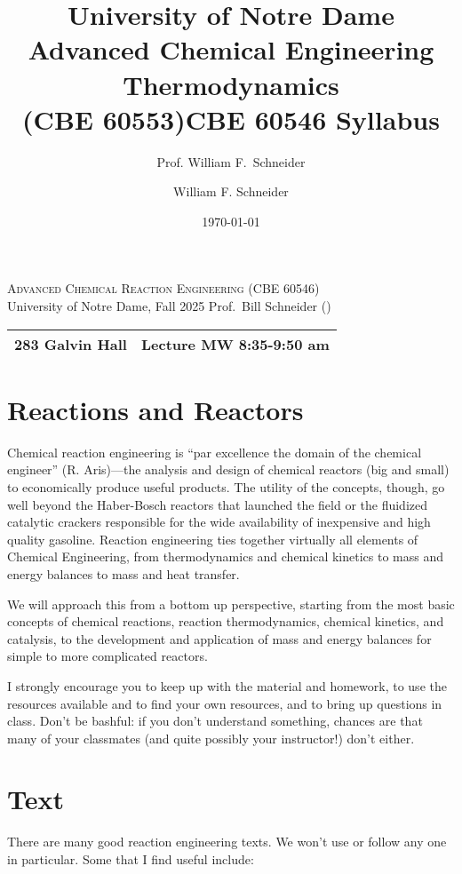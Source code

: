 \documentclass[11pt]{article}
\title{University of Notre Dame\\Advanced Chemical Engineering Thermodynamics\\(CBE 60553)}
\author{Prof. William F.\ Schneider}
\author{William F. Schneider}
\date{\today}
\title{CBE 60546 Syllabus}
\begin{document}
\begin{OPTIONS}
\end{OPTIONS}

\begin{center}
\textsc{\Large Advanced Chemical Reaction Engineering (CBE 60546)}\\University of Notre Dame, Fall 2025
Prof.\ Bill Schneider ()
\end{center}
\begin{tabular*}{\textwidth}{@{\extracolsep{\fill}}l r}
\hline
283 Galvin Hall & Lecture MW 8:35-9:50 am\\
\hline
\end{tabular*}
\section{Reactions and Reactors}
\label{sec:orgd86bf55}
Chemical reaction engineering is ``par excellence the domain of the chemical engineer'' (R. Aris)---the analysis and design of chemical reactors (big and small) to economically produce useful products.  The utility of the concepts, though, go well beyond the Haber-Bosch reactors that launched the field or the fluidized catalytic crackers responsible for the wide availability of inexpensive and high quality gasoline.  Reaction engineering ties together virtually all elements of Chemical Engineering, from thermodynamics and chemical kinetics to mass and energy balances to mass and heat transfer.  

We will approach this from a bottom up perspective, starting from the most basic concepts of chemical reactions, reaction thermodynamics, chemical kinetics, and catalysis, to the development and application of mass and energy balances for simple to more complicated reactors. 

I strongly encourage you to keep up with the material and homework, to use the resources available and to find your own resources, and to bring up questions in class. Don’t be bashful: if you don’t understand something, chances are that many of your classmates (and quite possibly your instructor!) don’t either.
\section{Text}
\label{sec:orge9b432f}
There are many good reaction engineering texts. We won't use or follow any one in particular. Some that I find useful include: 
\end{document}

